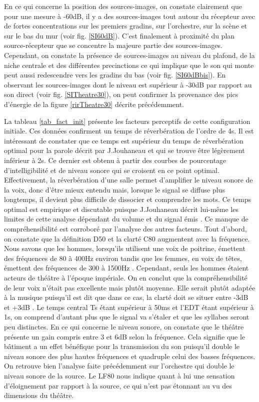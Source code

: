 %
En ce qui concerne la position des sources-images, on constate clairement que pour une mesure à -60dB, il y a des sources-images tout autour du récepteur avec de fortes concentrations sur les premiers gradins, sur l'orchestre, sur la scène et sur le bas du mur (voir fig. \ref{SI60dB}). C'est finalement à proximité du plan source-récepteur que se concentre la majeure partie des sources-images. Cependant, on constate la présence de sources-images au niveau du plafond, de la niche centrale et des différentes \glspl{precinction} ce qui implique que le son qui monte peut aussi redescendre vers les gradins du bas (voir fig. \ref{SI60dBbis}). En observant les sources-images dont le niveau est supérieur à -30dB par rapport au son direct (voir fig. \ref{SITheatre30}), on peut confirmer la provenance des pics d'énergie de la figure \ref{rirTheatre30} décrite précédemment. 

La tableau \ref{tab_fact_init} présente les facteurs perceptifs de cette configuration initiale. Ces données confirment un temps de réverbération de l'ordre de 4s. Il est intéressant de constater que ce temps est supérieur du temps de réverbération optimal pour la parole décrit par J.Jouhaneau \cite[p.209]{jouhaneau} et qui se trouve être légèrement inférieur à 2s. Ce dernier est obtenu à partir des courbes de pourcentage d'intelligibilité et de niveau sonore qui se croisent en ce point optimal. Effectivement, la réverbération d'une salle permet d'amplifier le niveau sonore de la voix, donc d'être mieux entendu mais, lorsque le signal se diffuse plus longtemps, il devient plus difficile de dissocier et comprendre les mots. Ce temps optimal est empirique et discutable puisque J.Jouhaneau décrit lui-même les limites de cette analyse dépendant du volume et du signal émis \cite[p.218]{jouhaneau}. Ce manque de compréhensibilité est corroboré par l'analyse des autres facteurs. Tout d'abord, on constate que la définition \gls{D50} et la clarté \gls{C80} augmentent avec la fréquence. Nous savons que les hommes, lorsqu'ils utilisent une voix de poitrine, émettent des fréquences de 80 à 400Hz environ tandis que les femmes, en voix de têtes, émettent des fréquences de 300 à 1500Hz \cite[Mécanismes vocaux]{voix}. Cependant, seuls les hommes étaient acteurs de théâtre à l'époque impériale. On en conclut que la compréhensibilité de leur voix n'était pas excellente mais plutôt moyenne. Elle serait plutôt adaptée à la musique puisqu'il est dit que dans ce cas, la clarté doit se situer entre -3dB et +3dB \cite[p.59]{acoustique}. Le temps central \gls{Ts} étant supérieur à 50ms et l'\gls{EDT} étant supérieur à 1s, on comprend d'autant plus que le signal va s'étaler et que les syllabes seront peu distinctes. En ce qui concerne le niveau sonore, on constate que le théâtre présente un gain compris entre 3 et 6dB selon la fréquence. Cela signifie que le bâtiment a un effet bénéfique pour la transmission du son puisqu'il double le niveau sonore des plus hautes fréquences et quadruple celui des basses fréquences. On retrouve bien l'analyse faite précédemment sur l'orchestre qui double le niveau sonore de la source. Le \gls{LF80} nous indique quant à lui une sensation d'éloignement par rapport à la source, ce qui n'est pas étonnant au vu des dimensions du théâtre.

